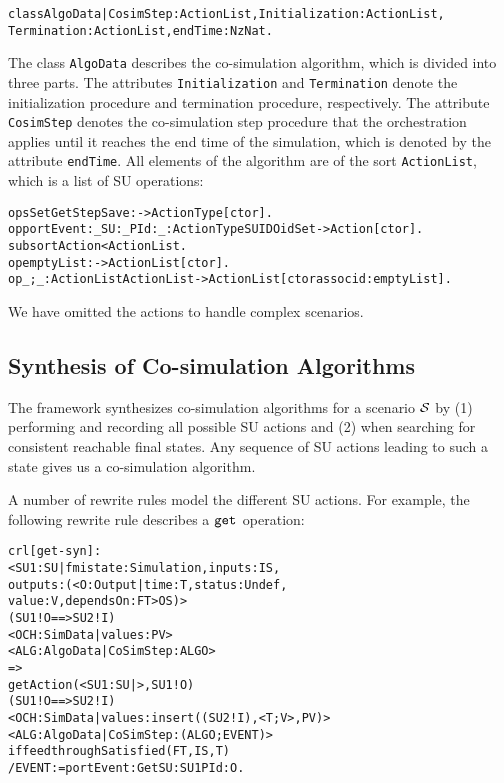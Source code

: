 \small
\begin{alltt}
class AlgoData | CosimStep : ActionList,   Initialization : ActionList, 
                 Termination : ActionList, endTime : NzNat .
\end{alltt}
\normalsize

The class \texttt{AlgoData} describes the co-simulation algorithm, which is divided into three parts.
The attributes \texttt{Initialization} and \texttt{Termination} denote the initialization procedure and termination procedure, respectively.
The attribute \texttt{CosimStep} denotes the co-simulation step procedure that the orchestration applies until it reaches the end time of the simulation, which is denoted by the attribute \texttt{endTime}.
All elements of the algorithm are of the sort \texttt{ActionList}, which is a list of SU operations:

\small
\begin{alltt}
ops Set Get Step Save : -> ActionType [ctor] . 
op portEvent:_SU:_PId:_ : ActionType SUID OidSet -> Action [ctor] .
subsort Action < ActionList .
op emptyList : -> ActionList [ctor] .
op _;_ : ActionList ActionList -> ActionList [ctor assoc id: emptyList] .
\end{alltt}
\normalsize

We have omitted the actions to handle complex scenarios.


\subsection{Synthesis of Co-simulation Algorithms}
The framework synthesizes co-simulation algorithms for a scenario $\mathcal{S}$ by (1) performing and recording all possible SU actions and (2) when searching for consistent reachable final states.
Any sequence of SU actions leading to such a state gives us a co-simulation algorithm.

A number of rewrite rules model the different SU actions.
For example, the following rewrite rule describes a $\mathtt{get}_{}$ operation:
\small
\begin{alltt}
crl [get-syn] :
    < SU1 : SU | fmistate : Simulation, inputs : IS, 
                  outputs : (< O : Output | time : T, status : Undef, 
                                            value : V, dependsOn : FT > OS) > 
    (SU1 ! O ==> SU2 ! I)
    < OCH : SimData | values : PV > 
    < ALG : AlgoData | CoSimStep : ALGO >
    => 
    getAction(< SU1 : SU | >, SU1 ! O)
    (SU1 ! O ==> SU2 ! I)
    < OCH : SimData | values : insert((SU2 ! I), < T ; V >, PV) >  
    < ALG : AlgoData | CoSimStep : (ALGO ; EVENT) >
  if feedthroughSatisfied(FT, IS, T) 
    / EVENT := portEvent: Get SU: SU1 PId: O . 
\end{alltt}
\normalsize

